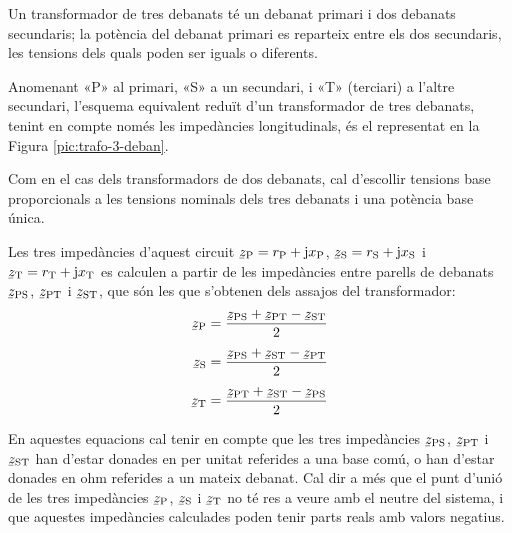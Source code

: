 Un transformador de tres debanats té un debanat primari i dos debanats secundaris; la potència del debanat primari es reparteix entre els dos secundaris, les tensions dels quals poden ser iguals o diferents.

Anomenant «P» al primari, «S» a un secundari, i «T» (terciari) a l'altre secundari, l'esquema equivalent reduït d'un transformador de tres debanats, tenint en compte només les impedàncies longitudinals,  és el representat en la Figura \vref{pic:trafo-3-deban}.

\begin{center}
    
    \label{pic:trafo-3-deban}
\end{center}

Com en el cas dels transformadors de dos debanats, cal d'escollir tensions base proporcionals a les tensions nominals dels tres debanats i una potència base única.

Les tres impedàncies d'aquest circuit $\cmplx{z}\ped{P} = r\ped{P} + \ju x\ped{P}$, $\cmplx{z}\ped{S} = r\ped{S} + \ju x\ped{S}$ i $\cmplx{z}\ped{T} = r\ped{T} + \ju x\ped{T}$ es calculen a partir de les impedàncies entre parells de debanats $\cmplx{z}\ped{PS}$, $\cmplx{z}\ped{PT}$ i $\cmplx{z}\ped{ST}$, que són les que s'obtenen dels assajos del transformador:
\begin{subequations}
\begin{align}
    \cmplx{z}\ped{P} &= \frac{\cmplx{z}\ped{PS}+\cmplx{z}\ped{PT}-\cmplx{z}\ped{ST}}{2}  \\[1ex]
    \cmplx{z}\ped{S} &= \frac{\cmplx{z}\ped{PS}+\cmplx{z}\ped{ST}-\cmplx{z}\ped{PT}}{2}  \\[1ex]
    \cmplx{z}\ped{T} &= \frac{\cmplx{z}\ped{PT}+\cmplx{z}\ped{ST}-\cmplx{z}\ped{PS}}{2}
\end{align}
\end{subequations}

En aquestes equacions cal tenir en compte que les tres impedàncies $\cmplx{z}\ped{PS}$, $\cmplx{z}\ped{PT}$ i $\cmplx{z}\ped{ST}$ han d'estar donades en per unitat referides a una base comú, o han d'estar donades en ohm referides a un mateix debanat. Cal dir a més que el punt d'unió de les tres impedàncies $\cmplx{z}\ped{P}$, $\cmplx{z}\ped{S}$ i $\cmplx{z}\ped{T}$ no té res a veure amb el neutre del sistema, i que aquestes impedàncies calculades poden tenir parts reals amb valors  negatius.


